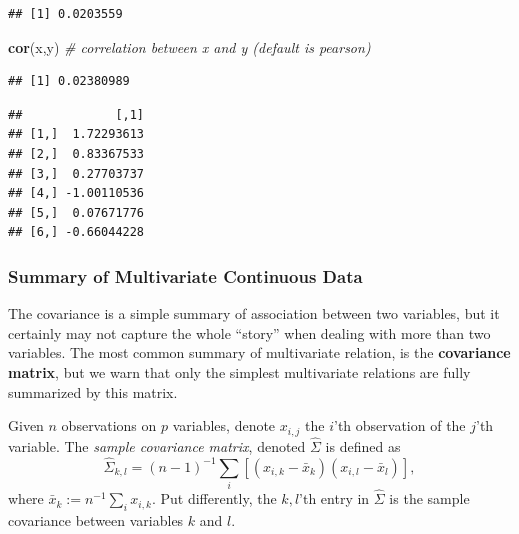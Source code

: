\documentclass[]{book}
\newenvironment{Shaded}{\begin{snugshade}}{\end{snugshade}}
\newcommand{\KeywordTok}[1]{\textcolor[rgb]{0.13,0.29,0.53}{\textbf{#1}}}
\newcommand{\StringTok}[1]{\textcolor[rgb]{0.31,0.60,0.02}{#1}}
\newcommand{\CommentTok}[1]{\textcolor[rgb]{0.56,0.35,0.01}{\textit{#1}}}
\newcommand{\OperatorTok}[1]{\textcolor[rgb]{0.81,0.36,0.00}{\textbf{#1}}}
\newcommand{\NormalTok}[1]{#1}
\theoremstyle{definition}
\theoremstyle{definition}
\theoremstyle{definition}
\theoremstyle{remark}
\let\BeginKnitrBlock\begin \let\EndKnitrBlock\end
\begin{document}
\begin{verbatim}
## [1] 0.0203559
\end{verbatim}

\begin{Shaded}
\begin{Highlighting}[]
\KeywordTok{cor}\NormalTok{(x,y) }\CommentTok{# correlation between x and y (default is pearson)}
\end{Highlighting}
\end{Shaded}

\begin{verbatim}
## [1] 0.02380989
\end{verbatim}

\begin{Shaded}
\end{Shaded}

\begin{verbatim}
##             [,1]
## [1,]  1.72293613
## [2,]  0.83367533
## [3,]  0.27703737
## [4,] -1.00110536
## [5,]  0.07671776
## [6,] -0.66044228
\end{verbatim}

\subsubsection{Summary of Multivariate Continuous
Data}\label{summary-of-multivariate-continuous-data}

The covariance is a simple summary of association between two variables,
but it certainly may not capture the whole ``story'' when dealing with
more than two variables. The most common summary of multivariate
relation, is the \textbf{covariance matrix}, but we warn that only the
simplest multivariate relations are fully summarized by this matrix.

\BeginKnitrBlock{definition}[Sample Covariance Matrix]
\protect\hypertarget{def:unnamed-chunk-127}{}{\label{def:unnamed-chunk-127}
{} }Given \(n\) observations on
\(p\) variables, denote \(x_{i,j}\) the \(i\)'th observation of the
\(j\)'th variable. The \emph{sample covariance matrix}, denoted
\(\hat \Sigma\) is defined as
\[\hat \Sigma_{k,l}=(n-1)^{-1} \sum_i [(x_{i,k}-\bar x_k)(x_{i,l}-\bar x_l)],\]
where \(\bar x_k:=n^{-1} \sum_i x_{i,k}\). Put differently, the
\(k,l\)'th entry in \(\hat \Sigma\) is the sample covariance between
variables \(k\) and \(l\).
\EndKnitrBlock{definition}
\end{document}
